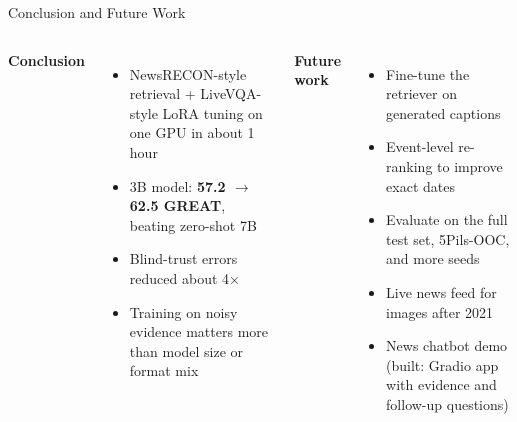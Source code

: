 \documentclass[aspectratio=169,10pt]{beamer}
\begin{document}
\begin{frame}{Conclusion and Future Work}
\begin{columns}[T]
\textbf{Conclusion}
\begin{itemize}
\small
\item NewsRECON-style retrieval + LiveVQA-style LoRA tuning on one GPU in about 1 hour
\item 3B model: \textbf{57.2 $\rightarrow$ 62.5 GREAT}, beating zero-shot 7B
\item Blind-trust errors reduced about 4$\times$
\item Training on noisy evidence matters more than model size or format mix
\end{itemize}
\textbf{Future work}
\begin{itemize}
\small
\item Fine-tune the retriever on generated captions
\item Event-level re-ranking to improve exact dates
\item Evaluate on the full test set, 5Pils-OOC, and more seeds
\item Live news feed for images after 2021
\item News chatbot demo (built: Gradio app with evidence and follow-up questions)
\end{itemize}
\end{columns}
\end{frame}
\end{document}
